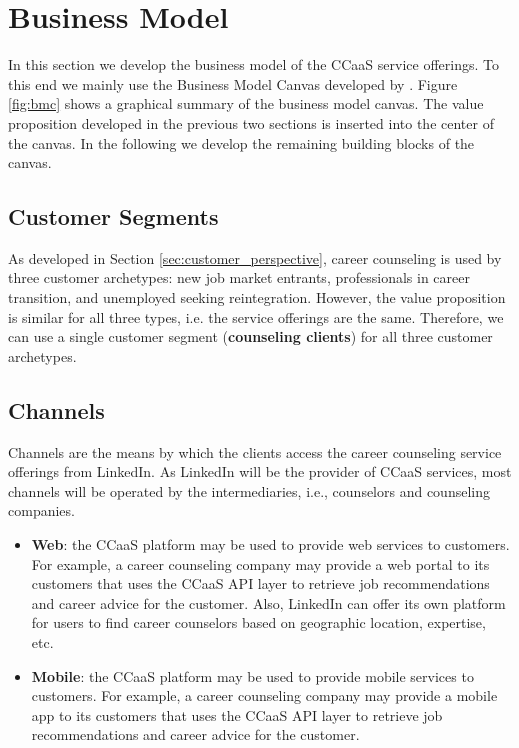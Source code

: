 \section{Business Model}
\label{sec:business_model}

In this section we develop the business model of the CCaaS service offerings. To this end we mainly
use the Business Model Canvas developed by \cite{osterwalderBusinessModelGeneration2010}. Figure \ref{fig:bmc}
shows a graphical summary of the business model canvas. The value proposition developed in the previous
two sections is inserted into the center of the canvas. In the following we develop the remaining building
blocks of the canvas.

\subsection{Customer Segments}

As developed in Section \ref{sec:customer_perspective}, career counseling is used by three customer archetypes:
new job market entrants, professionals in career transition, and unemployed seeking reintegration. However, the
value proposition is similar for all three types, i.e. the service offerings are the same. Therefore, we can use
a single customer segment (\textbf{counseling clients}) for all three customer archetypes.


\subsection{Channels}

Channels are the means by which the clients access the career counseling service offerings from LinkedIn.
As LinkedIn will be the provider of CCaaS services, most channels will be operated by the intermediaries,
i.e., counselors and counseling companies.

\begin{itemize}
    \item \textbf{Web}: the CCaaS platform may be used to provide web services to customers.
            For example, a career counseling company may provide a web portal to its customers
            that uses the CCaaS API layer to retrieve job recommendations and career advice for
            the customer. Also, LinkedIn can offer its own platform for users to find career
            counselors based on geographic location, expertise, etc.
    \item \textbf{Mobile}: the CCaaS platform may be used to provide mobile services to customers.
            For example, a career counseling company may provide a mobile app to its customers
            that uses the CCaaS API layer to retrieve job recommendations and career advice for
            the customer.
\end{itemize}

